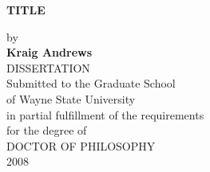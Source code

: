 \setcounter{page}{1} 
\thispagestyle{empty}
\begin{titlepage}


	\begin{center}

	\singlespacing
	\textbf{TITLE}\\
	\doublespacing
	
	by\\
	
	\textbf{Kraig Andrews}\\
	DISSERTATION\\
	

	
	
	
	Submitted to the Graduate School\\
	
        of Wayne State University\\
	in partial fulfillment of the requirements\\
	for the degree of\\
	\vspace{0.8cm}
	DOCTOR OF PHILOSOPHY\\

	2008\\
	\end{center}
	\begin{flushright}
	\\
   \vspace{1.0cm}
	 \\
   \vspace{0.7cm}
	\makebox[8.7cm][l]{$\overline {\hspace{7.8cm}}$} \\
   \vspace{0.9cm}
	\makebox[8.7cm][l]{$\overline {\hspace{7.8cm}}$} \\
   \vspace{0.9cm}
	\makebox[8.7cm][l]{$\overline {\hspace{7.8cm}}$} \\
	
	\end{flushright}

	\end{titlepage}
